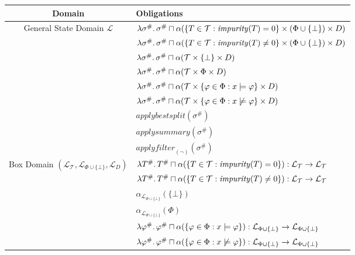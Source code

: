 \begin{figure}
\centering
\begin{tabular}{cl}
Domain & Obligations \\
\toprule
\multirow{9}{*}{General State Domain $\mathcal{L}$} &
$\lambda \sigma^\# \ldotp \sigma^\# \sqcap
\alpha(\{T \in \mathcal{T} : \mathit{impurity}(T) = 0\} \times (\Phi \cup \{\bot\}) \times D)$ \\
& $\lambda \sigma^\# \ldotp \sigma^\# \sqcap
\alpha(\{T \in \mathcal{T} : \mathit{impurity}(T) \neq 0\} \times (\Phi \cup \{\bot\}) \times D)$ \\
& $\lambda \sigma^\# \ldotp \sigma^\# \sqcap
\alpha(\mathcal{T} \times \{\bot\} \times D)$ \\
& $\lambda \sigma^\# \ldotp \sigma^\# \sqcap
\alpha(\mathcal{T} \times \Phi \times D)$ \\
& $\lambda \sigma^\# \ldotp \sigma^\# \sqcap
\alpha(\mathcal{T} \times \{\varphi \in \Phi : x \models \varphi\} \times D)$ \\
& $\lambda \sigma^\# \ldotp \sigma^\# \sqcap
\alpha(\mathcal{T} \times \{\varphi \in \Phi : x \not\models \varphi\} \times D)$ \\
& $\mathit{applybestsplit}(\sigma^\#)$ \\
& $\mathit{applysummary}(\sigma^\#)$ \\
& $\mathit{applyfilter}_{(\lnot)}(\sigma^\#)$ \\
\midrule
\multirow{9}{*}{Box Domain $(\mathcal{L}_\mathcal{T}, \mathcal{L}_{\Phi\cup\{\bot\}}, \mathcal{L}_D)$} &
$\lambda T^\# \ldotp T^\# \sqcap
\alpha(\{T \in \mathcal{T} : \mathit{impurity}(T) = 0\}) :
\mathcal{L}_\mathcal{T} \rightarrow \mathcal{L}_\mathcal{T}$ \\
& $\lambda T^\# \ldotp T^\# \sqcap
\alpha(\{T \in \mathcal{T} : \mathit{impurity}(T) \neq 0\}) :
\mathcal{L}_\mathcal{T} \rightarrow \mathcal{L}_\mathcal{T}$ \\
& $\alpha_{\mathcal{L}_{\Phi\cup\{\bot\}}}(\{\bot\})$ \\
& $\alpha_{\mathcal{L}_{\Phi\cup\{\bot\}}}(\Phi)$ \\
& $\lambda \varphi^\# \ldotp \varphi^\# \sqcap
\alpha(\{\varphi \in \Phi : x \models \varphi\}) :
\mathcal{L}_{\Phi\cup\{\bot\}} \rightarrow \mathcal{L}_{\Phi\cup\{\bot\}}$\\
& $\lambda \varphi^\# \ldotp \varphi^\# \sqcap
\alpha(\{\varphi \in \Phi : x \not\models \varphi\}) :
\mathcal{L}_{\Phi\cup\{\bot\}} \rightarrow \mathcal{L}_{\Phi\cup\{\bot\}}$\\

\end{tabular}
\end{figure}
